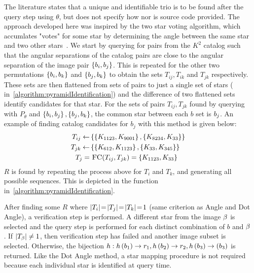 The literature states that a unique and identifiable trio is to be found after the query step using $\theta$,
but does not specify how nor is source code provided.
The approach developed here was inspired by the two star voting algorithm, which accumlates "votes" for some star by
determining the angle between the same star and two other stars~\cite{tichy:preliminaryTestsCommericalImagers}.
We start by querying for pairs from the $K^2$ catalog such that the angular separations of the catalog pairs are
close to the angular separation of the image pair $\left\{ b_i, b_j \right\}$.
This is repeated for the other two permutations $\left\{ b_i, b_k \right\}$ and $\left\{  b_j, b_k  \right\}$ to obtain
the sets $T_{ij}, T_{ik}$ and $T_{jk}$ respectively.
These sets are then flattened from sets of pairs to just a single set of stars (
in~\autoref{algorithm:pyramidIdentification}) and the difference of two flattened sets identify candidates for that
star.
For the sets of pairs $T_{ij}, T_{jk}$ found by querying with $P_\theta$ and $\left\{ b_i, b_j \right\},
\left\{ b_j, b_k \right\}$, the common star between each $b$ set is $b_j$.
An example of finding catalog candidates for $b_j$ with this method is given below:
\begin{equation}
    \begin{aligned}
        T_{ij} \gets& \set{ \set{\vv{K_{1123}}, \vv{K_{9001}}}, \set{\vv{K_{8234}}, \vv{K_{33}}} } \\
        T_{jk} \gets& \set{ \set{\vv{K_{612}}, \vv{K_{1123}}}, \set{\vv{K_{33}}, \vv{K_{345}}} } \\
        T_j =& \  \Call{FC}{T_{ij}, T_{jk}} = \set{\vv{K_{1123}}, \vv{K_{33}}}
    \end{aligned}
\end{equation}
$R$ is found by repeating the process above for $T_i$ and $T_k$, and generating all possible sequences.
This is depicted in the  function in~\autoref{algorithm:pyramidIdentification}.

After finding some $R$ where $\left| T_i \right| \!=\! \left| T_j \right| \!=\! \left| T_k \right| \!=\! 1$ (same criterion as Angle and Dot Angle), a
verification step is performed.
A different star from the image $\beta$ is selected and the query step is performed for each distinct combination
of $b$ and $\beta$.
If $\left| T_\beta \right| \neq 1$, then verification step has failed and another image subset is selected.
Otherwise, the bijection $h : h\left(b_1\right) \rightarrow r_1, h\left(b_2\right)
\rightarrow r_2, h\left(b_3\right) \rightarrow(b_3)$ is returned.
Like the Dot Angle method, a star mapping procedure is not required because each individual star is identified
at query time.

